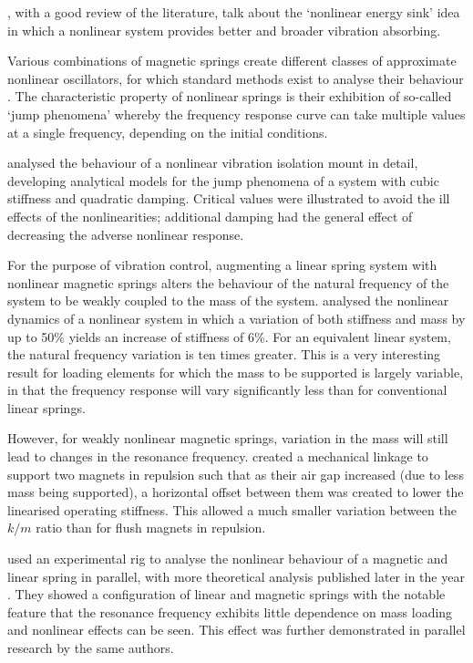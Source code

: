\textcite{starosvetsky2008}, with a good review of the literature, talk about the `nonlinear energy sink' idea in which a nonlinear system provides better and broader vibration absorbing.

Various combinations of magnetic springs create different classes of approximate nonlinear oscillators, for which standard methods exist to analyse their behaviour .
The characteristic property of nonlinear springs is their exhibition of so-called `jump phenomena' whereby the frequency response curve can take multiple values at a single frequency, depending on the initial conditions.

\textcite{jazar2006} analysed the behaviour of a nonlinear vibration isolation mount in detail, developing analytical models for the jump phenomena of a system with cubic stiffness and quadratic damping.
Critical values were illustrated to avoid the ill effects of the nonlinearities; additional damping had the general effect of decreasing the adverse nonlinear response.

For the purpose of vibration control, augmenting a linear spring system with nonlinear magnetic springs alters the behaviour of the natural frequency of the system to be weakly coupled to the mass of the system.
\textcite{dangola2006} analysed the nonlinear dynamics of a nonlinear system in which a variation of both stiffness and mass by up to 50\% yields an increase of stiffness of 6\%.
For an equivalent linear system, the natural frequency variation is ten times greater.
This is a very interesting result for loading elements for which the mass to be supported is largely variable, in that the frequency response will vary significantly less than for conventional linear springs.

However, for weakly nonlinear magnetic springs, variation in the mass will still lead to changes in the resonance frequency.
\textcite{todaka2001} created a mechanical linkage to support two magnets in repulsion such that as their air gap increased (due to less mass being supported), a horizontal offset between them was created to lower the linearised operating stiffness.
This allowed a much smaller variation between the $k/m$ ratio than for flush magnets in repulsion.

\textcite{bonisoli2007} used an experimental rig to analyse the nonlinear behaviour of a magnetic and linear spring in parallel, with more theoretical analysis published later in the year \cite{bonisoli2007b}.
They showed a configuration of linear and magnetic springs with the notable feature that the resonance frequency exhibits little dependence on mass loading and nonlinear effects can be seen.
This effect was further demonstrated in parallel research by the same authors.

